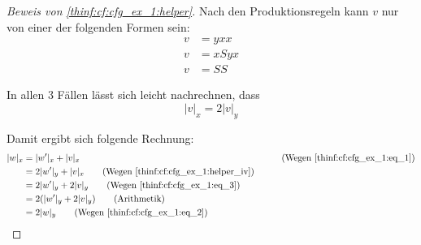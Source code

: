 \begin{example}
\begin{proof}[Beweis von \eqref{thinf:cf:cfg_ex_1:helper}]
		Nach den Produktionsregeln kann $v$ nur von einer der folgenden
		Formen sein:
		\begin{align*}
			v & = yxx \\
			v & = xSyx \\
			v & = SS
		\end{align*}

		In allen 3 Fällen lässt sich leicht nachrechnen, dass
		\begin{equation}
			\label{thinf:cf:cfg_ex_1:eq_3}
			|v|_x = 2|v|_y
		\end{equation}

		Damit ergibt sich folgende Rechnung:
		\begin{align}
			|w|_x
			& = |w'|_x + |v|_x & \tag{Wegen \eqref{thinf:cf:cfg_ex_1:eq_1}} \\
			& = 2|w'|_y + |v|_x \tag{Wegen \eqref{thinf:cf:cfg_ex_1:helper_iv}} \\
			& = 2|w'|_y + 2|v|_y \tag{Wegen \eqref{thinf:cf:cfg_ex_1:eq_3}} \\
			& = 2 (|w'|_y + 2|v|_y) \tag{Arithmetik} \\
			& = 2 |w|_y \tag{Wegen \eqref{thinf:cf:cfg_ex_1:eq_2}}
		\end{align}
	\end{proof}
	
\end{example}
